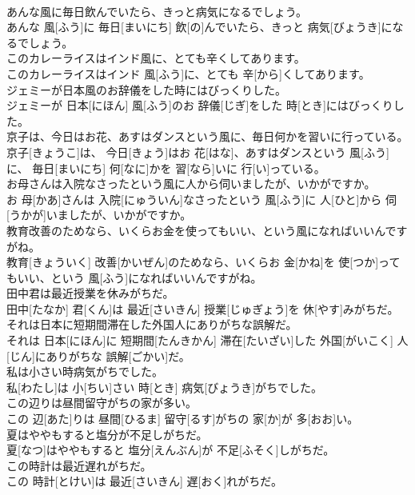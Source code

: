\documentclass[8pt]{extreport}
\begin{document}
\begin{CJK}{UTF8}{min}
\\	あんな風に毎日飲んでいたら、きっと病気になるでしょう。	
\\	あんな 風[ふう]に 毎日[まいにち] 飲[の]んでいたら、きっと 病気[びょうき]になるでしょう。
\\	このカレーライスはインド風に、とても辛くしてあります。	
\\	このカレーライスはインド 風[ふう]に、とても 辛[から]くしてあります。
\\	ジェミーが日本風のお辞儀をした時にはびっくりした。	
\\	ジェミーが 日本[にほん] 風[ふう]のお 辞儀[じぎ]をした 時[とき]にはびっくりした。
\\	京子は、今日はお花、あすはダンスという風に、毎日何かを習いに行っている。	
\\	京子[きょうこ]は、 今日[きょう]はお 花[はな]、あすはダンスという 風[ふう]に、 毎日[まいにち] 何[なに]かを 習[なら]いに 行[い]っている。
\\	お母さんは入院なさったという風に人から伺いましたが、いかがですか。	
\\	お 母[かあ]さんは 入院[にゅういん]なさったという 風[ふう]に 人[ひと]から 伺[うかが]いましたが、いかがですか。
\\	教育改善のためなら、いくらお金を使ってもいい、という風になればいいんですがね。	
\\	教育[きょういく] 改善[かいぜん]のためなら、いくらお 金[かね]を 使[つか]ってもいい、という 風[ふう]になればいいんですがね。
\\	田中君は最近授業を休みがちだ。	
\\	田中[たなか] 君[くん]は 最近[さいきん] 授業[じゅぎょう]を 休[やす]みがちだ。
\\	それは日本に短期間滞在した外国人にありがちな誤解だ。	
\\	それは 日本[にほん]に 短期間[たんきかん] 滞在[たいざい]した 外国[がいこく] 人[じん]にありがちな 誤解[ごかい]だ。
\\	私は小さい時病気がちでした。	
\\	私[わたし]は 小[ちい]さい 時[とき] 病気[びょうき]がちでした。
\\	この辺りは昼間留守がちの家が多い。	
\\	この 辺[あた]りは 昼間[ひるま] 留守[るす]がちの 家[か]が 多[おお]い。
\\	夏はややもすると塩分が不足しがちだ。	
\\	夏[なつ]はややもすると 塩分[えんぶん]が 不足[ふそく]しがちだ。
\\	この時計は最近遅れがちだ。	
\\	この 時計[とけい]は 最近[さいきん] 遅[おく]れがちだ。

\end{CJK}
\end{document}

